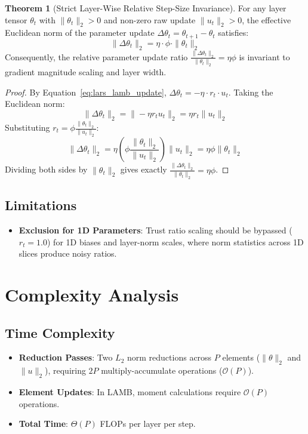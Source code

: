 \documentclass[11pt,a4paper]{article}
\theoremstyle{definition}
\newtheorem{theorem}{Theorem}[section]
\begin{document}
\begin{theorem}[Strict Layer-Wise Relative Step-Size Invariance]
For any layer tensor $\theta_t$ with $\|\theta_t\|_2 > 0$ and non-zero raw update $\|u_t\|_2 > 0$, the effective Euclidean norm of the parameter update $\Delta \theta_t = \theta_{t+1} - \theta_t$ satisfies:
\begin{equation}
\|\Delta \theta_t\|_2 = \eta \cdot \phi \cdot \|\theta_t\|_2
\end{equation}
Consequently, the relative parameter update ratio $\frac{\|\Delta \theta_t\|_2}{\|\theta_t\|_2} = \eta \phi$ is invariant to gradient magnitude scaling and layer width.
\end{theorem}

\begin{proof}
By Equation~\eqref{eq:lars_lamb_update}, $\Delta \theta_t = -\eta \cdot r_t \cdot u_t$. Taking the Euclidean norm:
\begin{equation}
\|\Delta \theta_t\|_2 = \|-\eta r_t u_t\|_2 = \eta r_t \|u_t\|_2
\end{equation}
Substituting $r_t = \phi \frac{\|\theta_t\|_2}{\|u_t\|_2}$:
\begin{equation}
\|\Delta \theta_t\|_2 = \eta \left(\phi \frac{\|\theta_t\|_2}{\|u_t\|_2}\right) \|u_t\|_2 = \eta \phi \|\theta_t\|_2
\end{equation}
Dividing both sides by $\|\theta_t\|_2$ gives exactly $\frac{\|\Delta \theta_t\|_2}{\|\theta_t\|_2} = \eta \phi$.
\end{proof}

\subsection{Limitations}
\begin{itemize}
    \item \textbf{Exclusion for 1D Parameters}: Trust ratio scaling should be bypassed ($r_t = 1.0$) for 1D biases and layer-norm scales, where norm statistics across 1D slices produce noisy ratios.
\end{itemize}

\section{Complexity Analysis}

\subsection{Time Complexity}
\begin{itemize}
    \item \textbf{Reduction Passes}: Two $L_2$ norm reductions across $P$ elements ($\|\theta\|_2$ and $\|u\|_2$), requiring $2P$ multiply-accumulate operations ($\mathcal{O}(P)$).
    \item \textbf{Element Updates}: In LAMB, moment calculations require $\mathcal{O}(P)$ operations.
    \item \textbf{Total Time}: $\Theta(P)$ FLOPs per layer per step.
\end{itemize}
\end{document}
